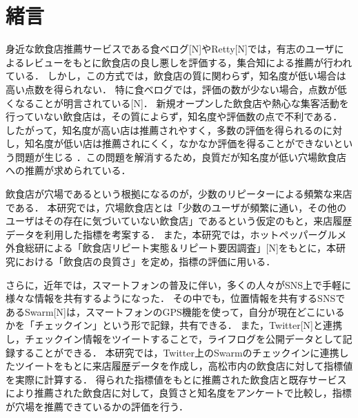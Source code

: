 \chapter{緒言}
\label{chap:intro}
身近な飲食店推薦サービスである食べログ[N]やRetty[N]では，有志のユーザによるレビューをもとに飲食店の良し悪しを評価する，集合知による推薦が行われている．
しかし，この方式では，飲食店の質に関わらず，知名度が低い場合は高い点数を得られない．
特に食べログでは，評価の数が少ない場合，点数が低くなることが明言されている[N]．
新規オープンした飲食店や熱心な集客活動を行っていない飲食店は，その質によらず，知名度や評価数の点で不利である．
したがって，知名度が高い店は推薦されやすく，多数の評価を得られるのに対し，知名度が低い店は推薦されにくく，なかなか評価を得ることができないという問題が生じる
．この問題を解消するため，良質だが知名度が低い穴場飲食店への推薦が求められている．

飲食店が穴場であるという根拠になるのが，少数のリピーターによる頻繁な来店である．
本研究では，穴場飲食店とは「少数のユーザが頻繁に通い，その他のユーザはその存在に気づいていない飲食店」であるという仮定のもと，来店履歴データを利用した指標を考案する．
また，本研究では，ホットペッパーグルメ外食総研による「飲食店リピート実態＆リピート要因調査」[N]をもとに，本研究における「飲食店の良質さ」を定め，指標の評価に用いる．

さらに，近年では，スマートフォンの普及に伴い，多くの人々がSNS上で手軽に様々な情報を共有するようになった．
その中でも，位置情報を共有するSNSであるSwarm[N]は，スマートフォンのGPS機能を使って，自分が現在どこにいるかを「チェックイン」という形で記録，共有できる．
また，Twitter[N]と連携し，チェックイン情報をツイートすることで，ライフログを公開データとして記録することができる．
本研究では，Twitter上のSwarmのチェックインに連携したツイートをもとに来店履歴データを作成し，高松市内の飲食店に対して指標値を実際に計算する．
得られた指標値をもとに推薦された飲食店と既存サービスにより推薦された飲食店に対して，良質さと知名度をアンケートで比較し，指標が穴場を推薦できているかの評価を行う．
